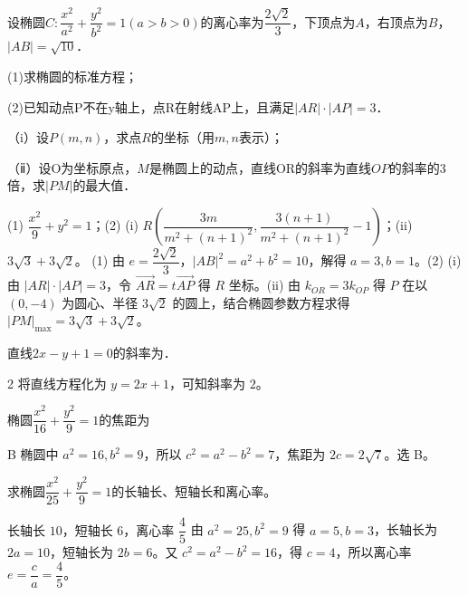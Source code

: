 \begin{question}
设椭圆$C:\dfrac{x^2}{a^2}+\dfrac{y^2}{b^2}=1(a>b>0)$的离心率为$\dfrac{2\sqrt{2}}{3}$，下顶点为$A$，右顶点为$B$，$|AB|=\sqrt{10}$．

(1)求椭圆的标准方程；

(2)已知动点P不在y轴上，点R在射线AP上，且满足$\left| AR \right|\cdot \left| AP \right|=3$．

（i）设$P(m,n)$，求点$R$的坐标（用$m,n$表示）；

（ⅱ）设O为坐标原点，$M$是椭圆上的动点，直线OR的斜率为直线$OP$的斜率的3倍，求$|PM|$的最大值．
\end{question}
\begin{answer}{(1) $\dfrac{x^2}{9}+y^2=1$；(2) (i) $R\left(\dfrac{3m}{m^2+(n+1)^2},\dfrac{3(n+1)}{m^2+(n+1)^2}-1\right)$；(ii) $3\sqrt3+3\sqrt2$。}
(1) 由 $e=\dfrac{2\sqrt2}{3}$，$|AB|^2=a^2+b^2=10$，解得 $a=3,b=1$。(2) (i) 由 $|AR|\cdot|AP|=3$，令 $\vec{AR}=t\vec{AP}$ 得 $R$ 坐标。(ii) 由 $k_{OR}=3k_{OP}$ 得 $P$ 在以 $(0,-4)$ 为圆心、半径 $3\sqrt2$ 的圆上，结合椭圆参数方程求得 $|PM|_{\max}=3\sqrt3+3\sqrt2$。
\end{answer}

\begin{question}[GPT生成]
直线$2x-y+1=0$的斜率为\blank{3cm}．
\end{question}
\begin{answer}{2}
将直线方程化为 $y=2x+1$，可知斜率为 $2$。
\end{answer}



\begin{question}[GPT生成]
椭圆$\dfrac{x^2}{16}+\dfrac{y^2}{9}=1$的焦距为\choiceBox
{}
\end{question}
\begin{answer}{B}
椭圆中 $a^2=16,b^2=9$，所以 $c^2=a^2-b^2=7$，焦距为 $2c=2\sqrt7$。选 B。
\end{answer}


\begin{question}[GPT生成]
求椭圆$\dfrac{x^2}{25}+\dfrac{y^2}{9}=1$的长轴长、短轴长和离心率。
\end{question}
\begin{answer}{长轴长 $10$，短轴长 $6$，离心率 $\dfrac45$}
由 $a^2=25,b^2=9$ 得 $a=5,b=3$，长轴长为 $2a=10$，短轴长为 $2b=6$。又 $c^2=a^2-b^2=16$，得 $c=4$，所以离心率 $e=\dfrac ca=\dfrac45$。
\end{answer}

